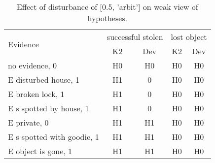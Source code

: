 \begin{table}\begin{tabular}{l|cc|cc}\toprule\multirow{2}{*}{Evidence} & \multicolumn{2}{c}{successful stolen}& \multicolumn{2}{c}{lost object}\\& {K2} & {Dev}& {K2} & {Dev}\\\midrule
no evidence, 0 & H0&H0&H0&H0\\E disturbed house, 1 & \cellcolor{Bittersweet}H1&\cellcolor{Bittersweet}0&H0&H0\\E broken lock, 1 & \cellcolor{Bittersweet}H1&\cellcolor{Bittersweet}0&H0&H0\\E s spotted by house, 1 & \cellcolor{Bittersweet}H1&\cellcolor{Bittersweet}0&H0&H0\\E private, 0 & H1&H1&H0&H0\\E s spotted with goodie, 1 & H1&H1&H0&H0\\E object is gone, 1 & H1&H1&H0&H0\\\bottomrule\end{tabular}\caption{Effect of disturbance of [0.5, 'arbit'] on weak view of hypotheses.}\end{table}
